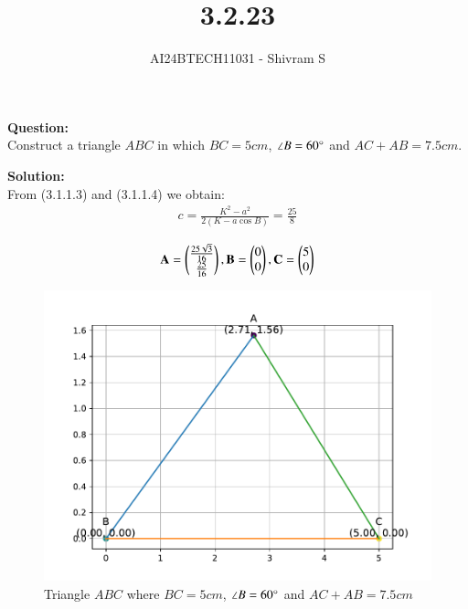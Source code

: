 \documentclass[journal]{IEEEtran}
\begin{document}

\vspace{3cm}

\title{3.2.23}
\author{AI24BTECH11031 - Shivram S
}
{\let\newpage\relax\maketitle}

\renewcommand{\thefigure}{\theenumi}
\renewcommand{\thetable}{\theenumi}
\setlength{\intextsep}{10pt} %


\renewcommand{\thetable}{\theenumi}


\textbf{Question: }\\
Construct a triangle $ABC$ in which $BC = 5cm$, $\angle B = 60 \degree$ and $AC + AB = 7.5cm$.

\textbf{Solution: } \\
From (3.1.1.3) and (3.1.1.4) we obtain:
\begin{align}
    c = \frac{K^2 - a^2}{2(K - a \cos B)} = \frac{25}{8}
\end{align}

\begin{align}
    \mathbf{A} = \begin{pmatrix}\frac{25 \sqrt 3}{16} \\ \frac{25}{16}\end{pmatrix}, \mathbf{B} = \begin{pmatrix}0 \\ 0\end{pmatrix}, \mathbf{C} = \begin{pmatrix}5 \\ 0\end{pmatrix}
\end{align}

\begin{figure}[h!]
    \centering
    \includegraphics[width=0.7\linewidth]{figs/fig.pdf}
    \caption{Triangle $ABC$ where $BC=5cm$, $\angle B = 60 \degree$ and $AC + AB = 7.5cm$}
\end{figure}
\end{document}
